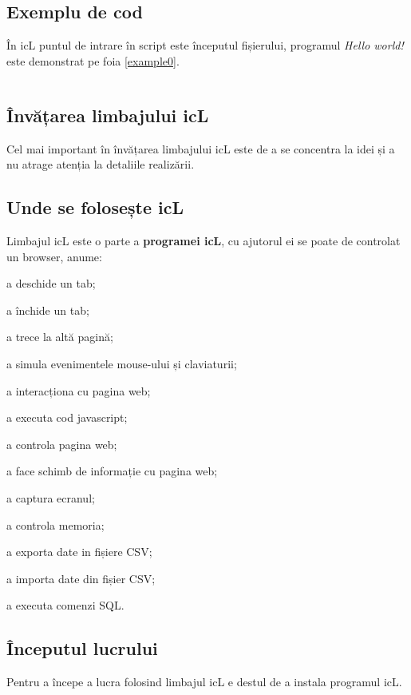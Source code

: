 \subsection{Exemplu de cod}

În icL puntul de intrare în script este începutul fișierului, programul \textit{Hello world!} este demonstrat pe foia \ref{example0}.

\begin{listing}
    \label{example0}
    \inputminted[linenos]{icl}{../sources/helloworld.icL}
\end{listing}

\subsection{Învățarea limbajului icL}

Cel mai important în învățarea limbajului icL este de a se concentra la idei și a nu atrage atenția la detaliile realizării.

\subsection{Unde se folosește icL}

Limbajul icL este o parte a \textbf{programei icL}, cu ajutorul ei se poate de controlat un browser, anume:
\begin{icItems}
\item
	a deschide un tab;
\item
	a închide un tab;
\item
	a trece la altă pagină;
\item
	a simula evenimentele mouse-ului și claviaturii;
\item
	a interacționa cu pagina web;
\item
	a executa cod javascript;
\item
	a controla pagina web;
\item
	a face schimb de informație cu pagina web;
\item
	a captura ecranul;
\item
	a controla memoria;
\item
	a exporta date in fișiere CSV;
\item
	a importa date din fișier CSV;
\item
	a executa comenzi SQL.
\end{icItems}

\subsection{Începutul lucrului}

Pentru a începe a lucra folosind limbajul icL e destul de a instala programul icL.
